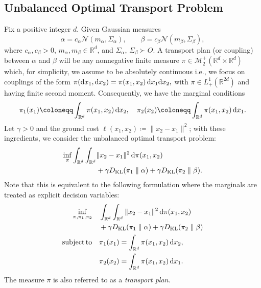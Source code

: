 \documentclass{ifacconf}
\newcommand{\R}{{\mathbb R}}
\newcommand{\rmd}{{\rm d}}
\newcommand{\Rd}{\R ^{d}}
\newcommand{\calM}{{\mathcal M}}
\newcommand{\calN}{{\mathcal N}}
\newcommand{\KL}[2]{D_{\mathrm{KL}}(#1 \parallel #2)}
\newcommand{\subj}{\mathrm{subject \,to}}
\begin{document}
\subsection{Unbalanced Optimal Transport Problem}\label{subsec:uot}
Fix a positive integer \(d\). Given Gaussian measures
\[
\alpha = c_\alpha \calN(m_\alpha,\Sigma_\alpha), \qquad
\beta  = c_\beta  \calN(m_\beta,\Sigma_\beta),
\]
where \(c_{\alpha},c_{\beta}>0\), \(m_{\alpha},m_{\beta} \in \Rd\), and \(\Sigma_{\alpha},\,\Sigma_{\beta}\succ O\). A transport plan (or coupling) between \(\alpha\) and \(\beta\) will be any nonnegative finite measure \(\pi \in \calM_2^{+}(\Rd \times \Rd)\) which, for simplicity, we assume to be absolutely continuous i.e., we focus on couplings of the form \(\pi(\rmd x_1, \rmd x_2) = \pi(x_1,x_2)\,\rmd x_1 \rmd x_2,\) with \(\pi\in L^1_+(\mathbb R^{2d})\) and having finite second moment. Consequently, we have the marginal conditions
\[
\pi_1(x_1) \coloneqq \int_{\Rd} \pi(x_1,x_2)\,\rmd x_2, \quad \pi_2(x_2) \coloneqq \int_{\Rd} \pi(x_1,x_2)\,\rmd x_1.
\]
Let \(\gamma>0\) and the ground cost \(\ell(x_1,x_2)\coloneqq \|x_2-x_1\|^2\); with these ingredients, we consider the unbalanced optimal transport problem:
\begin{equation}\label{eq:uot}
\begin{aligned}
\inf_{\pi} 
\int_{\Rd}\int_{\Rd} & \|x_2-x_1\|^2 \,\rmd \pi(x_1,x_2) \\
&+ \gamma \KL{\pi_1}{\alpha}
+ \gamma \KL{\pi_2}{\beta}.
\end{aligned}
\end{equation}
Note that this is equivalent to the following formulation where the marginals are treated as explicit decision variables:
\begin{equation}\label{eq:uot_marginals}
\begin{aligned}
\inf_{\pi,\pi_1,\pi_2}\quad &
\int_{\Rd}\int_{\Rd}  \|x_2-x_1\|^2 \,\rmd \pi(x_1,x_2) \\
& + \gamma \KL{\pi_1}{\alpha} + \gamma \KL{\pi_2}{\beta}\\
\subj\quad & \pi_1(x_1) = \int_{\Rd} \pi(x_1,x_2)\,\rmd x_2,\\
& \pi_2(x_2) = \int_{\Rd} \pi(x_1,x_2)\,\rmd x_1 .
\end{aligned}
\end{equation}
The measure $\pi$ is also referred to as a \emph{transport plan}.
\end{document}
